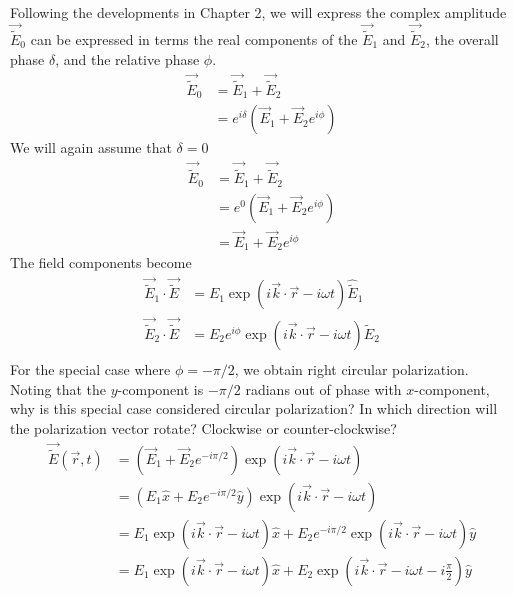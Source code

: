 \documentclass{article}
\begin{document}
Following the developments in Chapter 2, we will express the complex amplitude $\vec{\widetilde{E}}_0$ can be expressed in terms the real components of the $\vec{\widetilde{E}}_1$ and $\vec{\widetilde{E}}_2$, the overall phase $\delta$, and the relative phase $\phi$.
\begin{align}    
    \vec{\widetilde{E}}_0  &= \vec{\widetilde{E}}_1 + \vec{\widetilde{E}}_2 \\
    &= e^{i\delta}\left(\vec{E}_1 + \vec{E}_2 e^{i\phi}\right)
\end{align}
We will again assume that $\delta=0$
\begin{align}    
    \vec{\widetilde{E}}_0  &= \vec{\widetilde{E}}_1 + \vec{\widetilde{E}}_2 \\
    &= e^{0}\left(\vec{E}_1 + \vec{E}_2 e^{i\phi}\right)\\
    &= \vec{E}_1 + \vec{E}_2 e^{i\phi} \label{c3__e0_decomposed}
\end{align}
The field components become
\begin{align}
    \vec{\widetilde{E}}_1 \cdot  \vec{\widetilde{E}} &= E_1 \exp \left(i \vec{k} \cdot \vec{r} - i \omega t\right) \hat{\widetilde{E}}_1 \\
    \vec{\widetilde{E}}_2 \cdot  \vec{\widetilde{E}} &= E_2 e^{i\phi}\exp \left(i \vec{k} \cdot \vec{r} - i \omega t\right) \hat{\widetilde{E}}_2 \\
\end{align}
For the special case where $\phi=-\pi/2$, we obtain right circular polarization.  Noting that the $y$-component is $-\pi/2$ radians out of phase with $x$-component, why is this special case considered circular polarization?  In which direction will the polarization vector rotate?  Clockwise or counter-clockwise?
\begin{align}
     \vec{\widetilde{E}}\left(\vec{r},t\right) &= \left(\vec{E}_1 + \vec{E}_2 e^{-i\pi/2}\right) \exp \left(i \vec{k} \cdot \vec{r} - i \omega t\right)\\
     &= \left(E_1\hat{x} + E_2e^{-i\pi/2}\hat{y}\right) \exp \left(i \vec{k} \cdot \vec{r} - i \omega t\right) \\
     &= E_1\exp \left(i \vec{k} \cdot \vec{r} - i \omega t\right)\hat{x} + E_2e^{-i\pi/2}\exp \left(i \vec{k} \cdot \vec{r} - i \omega t\right)\hat{y} \\
     &= E_1\exp \left(i \vec{k} \cdot \vec{r} - i \omega t\right)\hat{x} + E_2\exp \left(i \vec{k} \cdot \vec{r} - i \omega t - i\frac{\pi}{2}\right)\hat{y}
\end{align}
\end{document}
